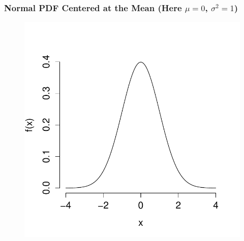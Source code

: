 \documentclass[handout]{beamer}
\begin{document}


\begin{frame}
\frametitle{Normal PDF Centered at the Mean (Here $\mu = 0$, $\sigma^2 = 1$)}

\begin{figure}
\includegraphics[scale = 0.65]{./images/std_normal_PDF}
\end{figure}
\end{frame}

\end{document}
